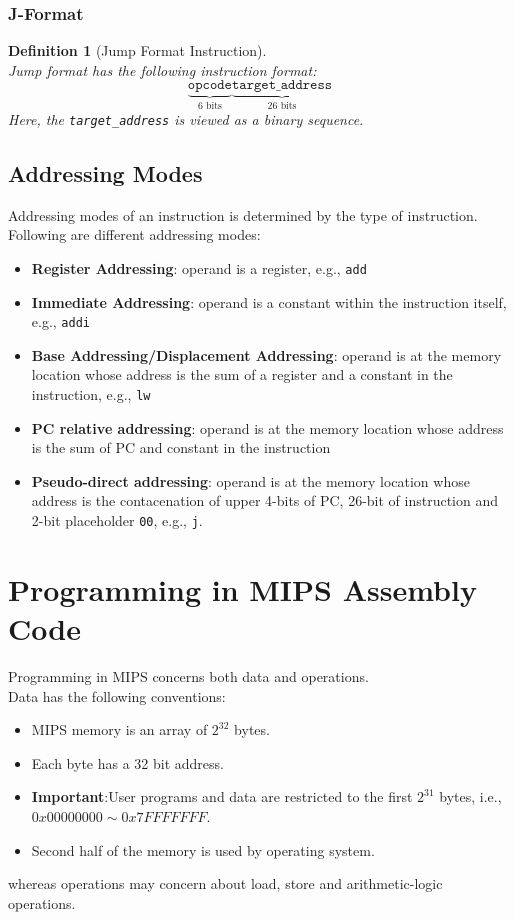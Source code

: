 \documentclass[12pt]{article}
\newtheorem{definition}{Definition}[section]
\theoremstyle{definition}
\begin{document}
\subsubsection{J-Format}
\begin{definition}[Jump Format Instruction]\hfill\\\normalfont
Jump format has the following instruction format:
\[
\underbrace{\texttt{opcode}}_{\text{6 bits}}\underbrace{\texttt{target\_address}}_{\text{26 bits}}
\]
Here, the \texttt{target\_address} is viewed as a binary sequence.
\end{definition}
\subsection{Addressing Modes}
Addressing modes of an instruction is determined by the type of instruction. Following are different addressing modes:
\begin{itemize}
  \item \textbf{Register Addressing}: operand is a register, e.g., \texttt{add}
  \item \textbf{Immediate Addressing}: operand is a constant within the instruction itself, e.g., \texttt{addi}
  \item \textbf{Base Addressing/Displacement Addressing}: operand is at the memory location whose address is the sum of a register and a constant in the instruction, e.g., \texttt{lw}
  \item \textbf{PC relative addressing}: operand is at the memory location whose address is the sum of PC and constant in the instruction
  \item \textbf{Pseudo-direct addressing}: operand is at the memory location whose address is the contacenation of upper 4-bits of PC, 26-bit of instruction and 2-bit placeholder \texttt{00}, e.g., \texttt{j}.
\end{itemize}
\clearpage
\section{Programming in MIPS Assembly Code}
Programming in MIPS concerns both data and operations.\\Data has the following conventions:
\begin{itemize}
  \item MIPS memory is an array of $2^32$ bytes.
  \item Each byte has a 32 bit address.
  \item \textbf{Important}:User programs and data are restricted to the first $2^31$ bytes, i.e., $0x00000000\sim 0x7FFFFFFF$.
  \item Second half of the memory is used by operating system.
\end{itemize}
whereas operations may concern about load, store and arithmetic-logic operations.
\end{document}
